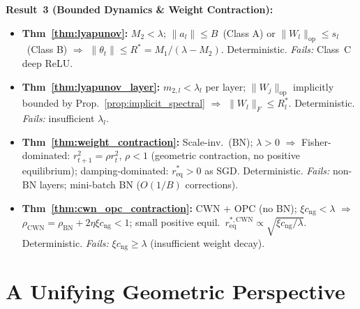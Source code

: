 \documentclass{article}
\providecommand{\norm}[1]{\lVert #1 \rVert}
\theoremstyle{plain}
\theoremstyle{definition}
\theoremstyle{remark}
\begin{document}
\vspace{-2pt}
\textbf{Result~3 (Bounded Dynamics \& Weight Contraction):}

\vspace{-2pt}
{\footnotesize
\begin{itemize}\setlength{\itemsep}{1pt}
\item \textbf{Thm~\ref{thm:lyapunov}:} $M_2\!<\!\lambda$; $\norm{a_l}\!\leq\!B$~(Class A) or $\norm{W_l}_{\mathrm{op}}\!\leq\!s_l$~(Class B) $\Rightarrow$ $\|\theta_t\|\!\leq\!R^*\!=\!M_1/(\lambda\!-\!M_2)$. Deterministic. \emph{Fails:} Class~C deep ReLU.
\item \textbf{Thm~\ref{thm:lyapunov_layer}:} $m_{2,l}\!<\!\lambda_l$ per layer; $\norm{W_j}_{\mathrm{op}}$ implicitly bounded by Prop.~\ref{prop:implicit_spectral} $\Rightarrow$ $\|W_l\|_F\!\leq\!R_l^*$. Deterministic. \emph{Fails:} insufficient $\lambda_l$.
\item \textbf{Thm~\ref{thm:weight_contraction}:} Scale-inv.\ (BN); $\lambda\!>\!0$ $\Rightarrow$ Fisher-dominated: $r_{t+1}^2\!=\!\rho r_t^2$, $\rho\!<\!1$ (geometric contraction, no positive equilibrium); damping-dominated: $r_{\mathrm{eq}}^*\!>\!0$ as SGD. Deterministic. \emph{Fails:} non-BN layers; mini-batch BN ($O(1/B)$ corrections).
\item \textbf{Thm~\ref{thm:cwn_opc_contraction}:} CWN + OPC (no BN); $\xi c_{\mathrm{ng}}\!<\!\lambda$ $\Rightarrow$ $\rho_{\mathrm{CWN}}\!=\!\rho_{\mathrm{BN}}\!+\!2\eta\xi c_{\mathrm{ng}}\!<\!1$; small positive equil.\ $r_{\mathrm{eq}}^{*,\mathrm{CWN}}\!\propto\!\sqrt{\xi c_{\mathrm{ng}}/\lambda}$. Deterministic. \emph{Fails:} $\xi c_{\mathrm{ng}}\!\geq\!\lambda$ (insufficient weight decay).
\end{itemize}
}

\section{A Unifying Geometric Perspective}
\label{sec:unifying}
\end{document}

